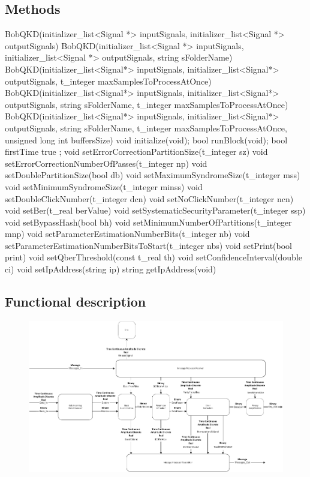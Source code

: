 \subsection*{Methods}
BobQKD(initializer\_list<Signal *> inputSignals, initializer\_list<Signal *> outputSignals)
\bigbreak
BobQKD(initializer\_list<Signal *> inputSignals, initializer\_list<Signal *> outputSignals, string sFolderName) 
\bigbreak
BobQKD(initializer\_list<Signal*> inputSignals, initializer\_list<Signal*> outputSignals, t\_integer maxSamplesToProcessAtOnce)
\bigbreak
BobQKD(initializer\_list<Signal*> inputSignals, initializer\_list<Signal*> outputSignals, string sFolderName, t\_integer maxSamplesToProcessAtOnce)
\bigbreak
BobQKD(initializer\_list<Signal*> inputSignals, initializer\_list<Signal*> outputSignals, string sFolderName, t\_integer maxSamplesToProcessAtOnce, unsigned long int buffersSize)
\bigbreak
void initialize(void);
\bigbreak
bool runBlock(void);
\bigbreak
bool firstTime{ true };
\bigbreak
void setErrorCorrectionPartitionSize(t\_integer sz)
\bigbreak
void setErrorCorrectionNumberOfPasses(t\_integer np)
\bigbreak
void setDoublePartitionSize(bool db)
\bigbreak
void setMaximumSyndromeSize(t\_integer mss)
\bigbreak
void setMinimumSyndromeSize(t\_integer minss)
\bigbreak
void setDoubleClickNumber(t\_integer dcn)
\bigbreak
void setNoClickNumber(t\_integer ncn)
\bigbreak
void setBer(t\_real berValue)
\bigbreak
void setSystematicSecurityParameter(t\_integer ssp)
\bigbreak
void setBypassHash(bool bh)
\bigbreak
void setMinimumNumberOfPartitions(t\_integer mnp)
\bigbreak
void setParameterEstimationNumberBits(t\_integer nb)
\bigbreak
void setParameterEstimationNumberBitsToStart(t\_integer nbs)
\bigbreak
void setPrint(bool print)
\bigbreak
void setQberThreshold(const t\_real th)
\bigbreak
void setConfidenceInterval(double ci)
\bigbreak
void setIpAddress(string ip)
\bigbreak
string getIpAddress(void)
\bigbreak

\subsection*{Functional description}
\begin{figure}[H]
	\centering
	\includegraphics{./lib/bob_qkd2/figures/blockDiagram_bob.pdf}
\end{figure}

